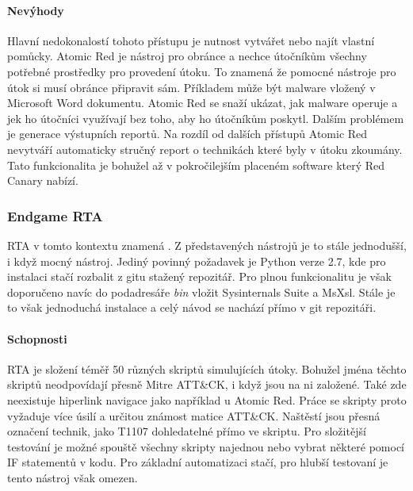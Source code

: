\paragraph{Nevýhody}
Hlavní nedokonalostí tohoto přístupu je nutnost vytvářet nebo najít vlastní pomůcky.
Atomic Red je nástroj pro obránce a nechce útočníkům všechny potřebné prostředky pro provedení útoku.
To znamená že pomocné nástroje pro útok si musí obránce připravit sám.
Příkladem může být malware vložený v Microsoft Word dokumentu.
Atomic Red se snaží ukázat, jak malware operuje a jek ho útočníci využívají bez toho, aby ho útočníkům poskytl.
Dalším problémem je generace výstupních reportů.
Na rozdíl od dalších přístupů Atomic Red nevytváří automaticky stručný report o technikách které byly v útoku zkoumány.
Tato funkcionalita je bohužel až v pokročilejším placeném software který Red Canary nabízí.\cite{csoonline_4_testing_frameworks}


\subsubsection{Endgame RTA}
\ac{RTA} v tomto kontextu znamená .
Z představených nástrojů je to stále jednodušší, i když mocný nástroj.
Jediný povinný požadavek je Python verze 2.7, kde pro instalaci stačí rozbalit z gitu stažený repozitář.
Pro plnou funkcionalitu je však doporučeno navíc do podadresáře \textit{bin} vložit Sysinternals Suite a MsXsl.
Stále je to však jednoduchá instalace a celý návod se nachází přímo v git repozitáři.\cite{endgame_rta}

\paragraph{Schopnosti}
\ac{RTA} je složení téměř 50 různých skriptů simulujících útoky.
Bohužel jména těchto skriptů neodpovídají přesně Mitre ATT\&CK, i když jsou na ni založené.
Také zde neexistuje hiperlink navigace jako například u Atomic Red.
Práce se skripty proto vyžaduje více úsilí a určitou známost matice ATT\&CK\@.
Naštěstí jsou přesná označení technik, jako T1107 dohledatelné přímo ve skriptu.
Pro složitější testování je možné spouště všechny skripty najednou nebo vybrat některé pomocí IF statementů v kodu.
Pro základní automatizaci stačí, pro hlubší testovaní je tento nástroj však omezen.\cite{csoonline_4_testing_frameworks}



